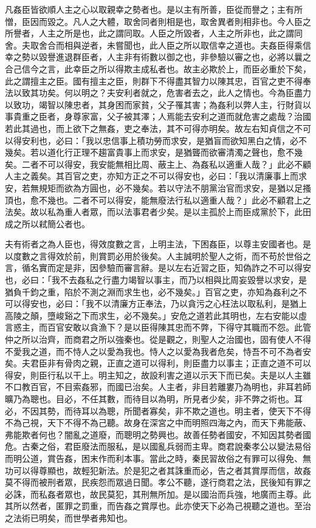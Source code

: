 
\begin{pinyinscope}
凡姦臣皆欲順人主之心以取親幸之勢者也。是以主有所善，臣從而譽之；主有所憎，臣因而毀之。凡人之大體，取舍同者則相是也，取舍異者則相非也。今人臣之所譽者，人主之所是也，此之謂同取。人臣之所毀者，人主之所非也，此之謂同舍。夫取舍合而相與逆者，未嘗聞也，此人臣之所以取信幸之道也。夫姦臣得乘信幸之勢以毀譽進退群臣者，人主非有術數以御之也，非參驗以審之也，必將以曩之合己信今之言，此幸臣之所以得欺主成私者也。故主必欺於上，而臣必重於下矣，此之謂擅主之臣。國有擅主之臣，則群下不得盡其智力以陳其忠，百官之吏不得奉法以致其功矣。何以明之？夫安利者就之，危害者去之，此人之情也。今為臣盡力以致功，竭智以陳忠者，其身困而家貧，父子罹其害；為姦利以弊人主，行財貨以事貴重之臣者，身尊家富，父子被其澤；人焉能去安利之道而就危害之處哉？治國若此其過也，而上欲下之無姦，吏之奉法，其不可得亦明矣。故左右知貞信之不可以得安利也，必曰：「我以忠信事上積功勞而求安，是猶盲而欲知黑白之情，必不幾矣。若以道化行正理不趨富貴事上而求安，是猶聾而欲審清濁之聲也，愈不幾矣。二者不可以得安，我安能無相比周、蔽主上、為姦私以適重人哉？」此必不顧人主之義矣。其百官之吏，亦知方正之不可以得安也，必曰：「我以清廉事上而求安，若無規矩而欲為方圓也，必不幾矣。若以守法不朋黨治官而求安，是猶以足搔頂也，愈不幾也。二者不可以得安，能無廢法行私以適重人哉？」此必不顧君上之法矣。故以私為重人者眾，而以法事君者少矣。是以主孤於上而臣成黨於下，此田成之所以弒簡公者也。

夫有術者之為人臣也，得效度數之言，上明主法，下困姦臣，以尊主安國者也。是以度數之言得效於前，則賞罰必用於後矣。人主誠明於聖人之術，而不苟於世俗之言，循名實而定是非，因參驗而審言辭。是以左右近習之臣，知偽詐之不可以得安也，必曰：「我不去姦私之行盡力竭智以事主，而乃以相與比周妄毀譽以求安，是猶負千鈞之重，陷於不測之淵而求生也，必不幾矣。」百官之吏，亦知為姦利之不可以得安也，必曰：「我不以清廉方正奉法，乃以貪污之心枉法以取私利，是猶上高陵之顛，墮峻谿之下而求生，必不幾矣。」安危之道若此其明也，左右安能以虛言惑主，而百官安敢以貪漁下？是以臣得陳其忠而不弊，下得守其職而不怨。此管仲之所以治齊，而商君之所以強秦也。從是觀之，則聖人之治國也，固有使人不得不愛我之道，而不恃人之以愛為我也。恃人之以愛為我者危矣，恃吾不可不為者安矣。夫君臣非有骨肉之親，正直之道可以得利，則臣盡力以事主；正直之道不可以得安，則臣行私以干上。明主知之，故設利害之道以示天下而已矣。夫是以人主雖不口教百官，不目索姦邪，而國已治矣。人主者，非目若離婁乃為明也，非耳若師曠乃為聰也。目必，不任其數，而待目以為明，所見者少矣，非不弊之術也。耳必，不因其勢，而待耳以為聰，所聞者寡矣，非不欺之道也。明主者，使天下不得不為己視，天下不得不為己聽。故身在深宮之中而明照四海之內，而天下弗能蔽、弗能欺者何也？闇亂之道廢，而聰明之勢興也。故善任勢者國安，不知因其勢者國危。古秦之俗，君臣廢法而服私，是以國亂兵弱而主卑。商君說秦孝公以變法易俗而明公道，賞告姦，困末作而利本事。當此之時，秦民習故俗之有罪可以得免、無功可以得尊顯也，故輕犯新法。於是犯之者其誅重而必，告之者其賞厚而信，故姦莫不得而被刑者眾，民疾怨而眾過日聞。孝公不聽，遂行商君之法，民後知有罪之必誅，而私姦者眾也，故民莫犯，其刑無所加。是以國治而兵強，地廣而主尊。此其所以然者，匿罪之罰重，而告姦之賞厚也。此亦使天下必為己視聽之道也。至治之法術已明矣，而世學者弗知也。


\end{pinyinscope}
